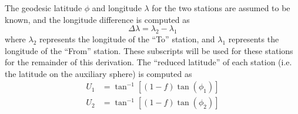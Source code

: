The geodesic latitude $\phi$ and longitude $\lambda$ for the two stations are assumed to be known, and the longitude difference is computed as 
\begin{equation}
\Delta\lambda = \lambda_2 - \lambda_1
\end{equation}
where $\lambda_2$ represents the longitude of the ``To'' station, and $\lambda_1$ represents the longitude of the ``From'' station.  These subscripts will be used for these stations for the remainder of this derivation.  The ``reduced latitude'' of each station (i.e. the latitude on the auxiliary sphere) is computed as
\begin{equation}
\begin{split}
U_1 &= \tan^{-1}\left[ (1-f) \tan(\phi_1) \right] \\ 
U_2 &= \tan^{-1}\left[ (1-f) \tan(\phi_2) \right]
\end{split}
\end{equation}

